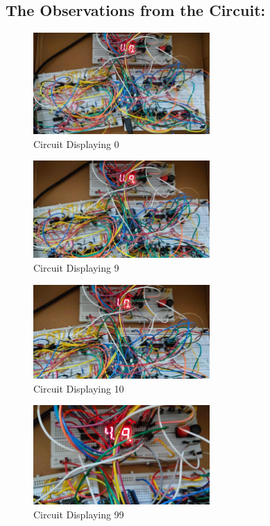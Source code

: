 \documentclass[a4paper,12pt]{article}
\begin{document}
\subsection{\textbf{The Observations from the Circuit:}}
\begin{figure}[H]
\centering
\includegraphics[width=0.6\textwidth]{figs/r_0.png}
	\caption*{Circuit Displaying 0}
\end{figure}
\begin{figure}[H]
\centering
\includegraphics[width=0.6\textwidth]{figs/r_9.png}
	\caption*{Circuit Displaying 9}
\end{figure}
\begin{figure}[H]
\centering
\includegraphics[width=0.6\textwidth]{figs/r_10.png}
	\caption*{Circuit Displaying 10}
\end{figure}
\begin{figure}[H]
\centering
\includegraphics[width=0.6\textwidth]{figs/r_99.png}
	\caption*{Circuit Displaying 99}
\end{figure}
\end{document}

